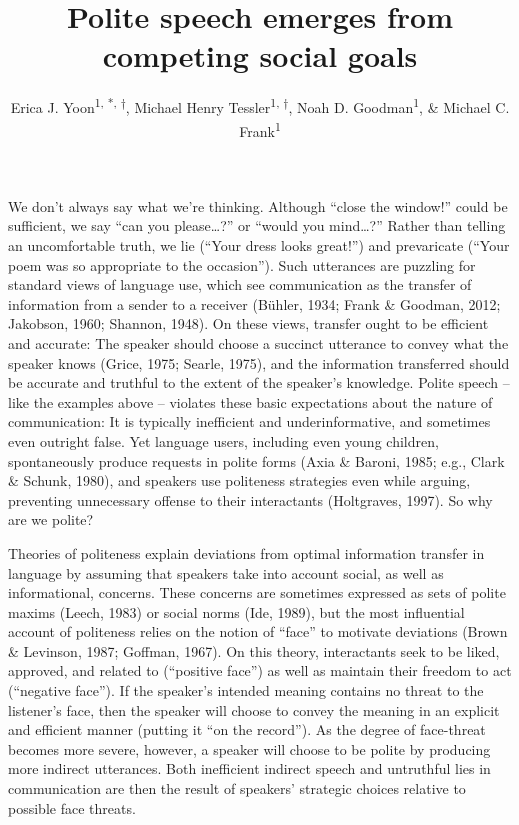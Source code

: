 \documentclass[floatsintext,mask,man]{apa6}
\title{Polite speech emerges from competing social goals}
\author{Erica J. Yoon\textsuperscript{1, *, †}, Michael Henry Tessler\textsuperscript{1, †}, Noah D. Goodman\textsuperscript{1}, \& Michael C. Frank\textsuperscript{1}}
\affiliation{
    \vspace{0.5cm}
          \textsuperscript{1} Department of Psychology, Stanford University\\
          \textsuperscript{*} Corresponding author\\
          \textsuperscript{†} These authors contributed equally to this work.  }
\theoremstyle{definition}
\theoremstyle{definition}
\theoremstyle{definition}
\theoremstyle{remark}
\begin{document}
\maketitle

\setcounter{secnumdepth}{0}



 

\newcommand{\red}[1]{{\textcolor{Red}{#1}}}
\newcommand{\mht}[1]{{\textcolor{Blue}{[mht: #1]}}}







We don't always say what we're thinking. Although \enquote{close the
window!} could be sufficient, we say \enquote{can you please\ldots{}?}
or \enquote{would you mind\ldots{}?} Rather than telling an
uncomfortable truth, we lie (\enquote{Your dress looks great!}) and
prevaricate (\enquote{Your poem was so appropriate to the occasion}).
Such utterances are puzzling for standard views of language use, which
see communication as the transfer of information from a sender to a
receiver (Bühler, 1934; Frank \& Goodman, 2012; Jakobson, 1960; Shannon,
1948). On these views, transfer ought to be efficient and accurate: The
speaker should choose a succinct utterance to convey what the speaker
knows (Grice, 1975; Searle, 1975), and the information transferred
should be accurate and truthful to the extent of the speaker's
knowledge. Polite speech -- like the examples above -- violates these
basic expectations about the nature of communication: It is typically
inefficient and underinformative, and sometimes even outright false. Yet
language users, including even young children, spontaneously produce
requests in polite forms (Axia \& Baroni, 1985; e.g., Clark \& Schunk,
1980), and speakers use politeness strategies even while arguing,
preventing unnecessary offense to their interactants (Holtgraves, 1997).
So why are we polite?

Theories of politeness explain deviations from optimal information
transfer in language by assuming that speakers take into account social,
as well as informational, concerns. These concerns are sometimes
expressed as sets of polite maxims (Leech, 1983) or social norms (Ide,
1989), but the most influential account of politeness relies on the
notion of \enquote{face} to motivate deviations (Brown \& Levinson,
1987; Goffman, 1967). On this theory, interactants seek to be liked,
approved, and related to (\enquote{positive face}) as well as maintain
their freedom to act (\enquote{negative face}). If the speaker's
intended meaning contains no threat to the listener's face, then the
speaker will choose to convey the meaning in an explicit and efficient
manner (putting it \enquote{on the record}). As the degree of
face-threat becomes more severe, however, a speaker will choose to be
polite by producing more indirect utterances. Both inefficient indirect
speech and untruthful lies in communication are then the result of
speakers' strategic choices relative to possible face threats.
\end{document}
